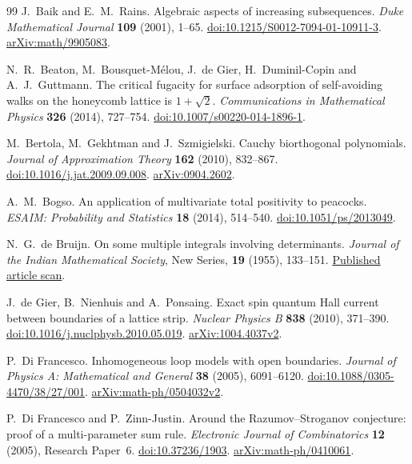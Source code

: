 \begin{thebibliography}{99}
J.~Baik and E.~M.~Rains.
Algebraic aspects of increasing subsequences.
\emph{Duke Mathematical Journal} \textbf{109} (2001), 1--65.
\href{https://doi.org/10.1215/S0012-7094-01-10911-3}{doi:10.1215/S0012-7094-01-10911-3}.
\href{https://arxiv.org/abs/math/9905083}{arXiv:math/9905083}.

N.~R.~Beaton, M.~Bousquet-M\'elou, J.~de Gier, H.~Duminil-Copin and A.~J.~Guttmann.
The critical fugacity for surface adsorption of self-avoiding walks on the honeycomb lattice is $1+\sqrt2$.
\emph{Communications in Mathematical Physics} \textbf{326} (2014), 727--754.
\href{https://doi.org/10.1007/s00220-014-1896-1}{doi:10.1007/s00220-014-1896-1}.

M.~Bertola, M.~Gekhtman and J.~Szmigielski.
Cauchy biorthogonal polynomials.
\emph{Journal of Approximation Theory} \textbf{162} (2010), 832--867.
\href{https://doi.org/10.1016/j.jat.2009.09.008}{doi:10.1016/j.jat.2009.09.008}.
\href{https://arxiv.org/abs/0904.2602}{arXiv:0904.2602}.

A.~M.~Bogso.
An application of multivariate total positivity to peacocks.
\emph{ESAIM: Probability and Statistics} \textbf{18} (2014), 514--540.
\href{https://doi.org/10.1051/ps/2013049}{doi:10.1051/ps/2013049}.

N.~G.~de Bruijn.
On some multiple integrals involving determinants.
\emph{Journal of the Indian Mathematical Society}, New Series,
\textbf{19} (1955), 133--151.
\href{https://pure.tue.nl/ws/files/1920642/597510.pdf}{Published article scan}.

J.~de Gier, B.~Nienhuis and A.~Ponsaing.
Exact spin quantum Hall current between boundaries of a lattice strip.
\emph{Nuclear Physics B} \textbf{838} (2010), 371--390.
\href{https://doi.org/10.1016/j.nuclphysb.2010.05.019}{doi:10.1016/j.nuclphysb.2010.05.019}.
\href{https://arxiv.org/abs/1004.4037v2}{arXiv:1004.4037v2}.

P.~Di Francesco.
Inhomogeneous loop models with open boundaries.
\emph{Journal of Physics A: Mathematical and General} \textbf{38} (2005), 6091--6120.
\href{https://doi.org/10.1088/0305-4470/38/27/001}{doi:10.1088/0305-4470/38/27/001}.
\href{https://arxiv.org/abs/math-ph/0504032v2}{arXiv:math-ph/0504032v2}.

P.~Di Francesco and P.~Zinn-Justin.
Around the Razumov--Stroganov conjecture: proof of a multi-parameter sum rule.
\emph{Electronic Journal of Combinatorics} \textbf{12} (2005), Research Paper~6.
\href{https://doi.org/10.37236/1903}{doi:10.37236/1903}.
\href{https://arxiv.org/abs/math-ph/0410061}{arXiv:math-ph/0410061}.


\end{thebibliography}
